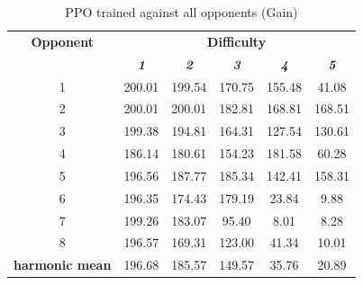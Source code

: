 \documentclass[conference]{IEEEtran}
\begin{document}
    \begin{table}[htbp]
        \caption{PPO trained against all opponents (Gain)}
        \begin{center}
            \begin{tabular}{|c|c|c|c|c|c|}
                \hline
                \textbf{Opponent} & \multicolumn{5}{|c|}{\textbf{Difficulty}} \\
                \cline{2-6}
                & \textbf{\textit{1}} & \textbf{\textit{2}} & \textbf{\textit{3}} & \textbf{\textit{4}} & \textbf{\textit{5}} \\
                \hline
                1                      & 200.01              & 199.54              & 170.75              & 155.48              & 41.08               \\
                2                      & 200.01              & 200.01              & 182.81              & 168.81              & 168.51              \\
                3                      & 199.38              & 194.81              & 164.31              & 127.54              & 130.61              \\
                4                      & 186.14              & 180.61              & 154.23              & 181.58              & 60.28               \\
                5                      & 196.56              & 187.77              & 185.34              & 142.41              & 158.31              \\
                6                      & 196.35              & 174.43              & 179.19              & 23.84               & 9.88                \\
                7                      & 199.26              & 183.07              & 95.40               & 8.01                & 8.28                \\
                8                      & 196.57              & 169.31              & 123.00              & 41.34               & 10.01               \\
                \hline
                \textbf{harmonic mean} & 196.68              & 185.57              & 149.57              & 35.76               & 20.89               \\
                \hline
            \end{tabular}
            \label{PPO against all opponents gain}
        \end{center}
    \end{table}
\end{document}
